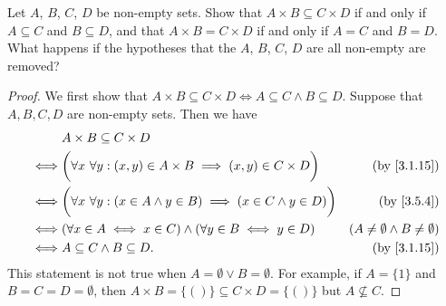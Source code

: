 \begin{exercise}\label{ex 3.5.6}
  Let \(A\), \(B\), \(C\), \(D\) be non-empty sets.
  Show that \(A \times B \subseteq C \times D\) if and only if \(A \subseteq C\) and \(B \subseteq D\), and that \(A \times B = C \times D\) if and only if \(A = C\) and \(B = D\).
  What happens if the hypotheses that the \(A\), \(B\), \(C\), \(D\) are all non-empty are removed?
\end{exercise}

\begin{proof}
  We first show that \(A \times B \subseteq C \times D \iff A \subseteq C \land B \subseteq D\).
  Suppose that \(A, B, C, D\) are non-empty sets.
  Then we have
  \begin{align*}
         & A \times B \subseteq C \times D                                                                                                         \\
    \iff & \bigg(\forall x \ \forall y : (x, y) \in A \times B \implies (x, y) \in C \times D\bigg)    & \text{(by \cref{3.1.15})}                 \\
    \iff & \bigg(\forall x \ \forall y :(x \in A \land y \in B) \implies (x \in C \land y \in D)\bigg) & \text{(by \cref{3.5.4})}                  \\
    \iff & (\forall x \in A \iff x \in C) \land (\forall y \in B \iff y \in D)                         & (A \neq \emptyset \land B \neq \emptyset) \\
    \iff & A \subseteq C \land B \subseteq D.                                                          & \text{(by \cref{3.1.15})}
  \end{align*}
  This statement is not true when \(A = \emptyset \lor B = \emptyset\).
  For example, if \(A = \{1\}\) and \(B = C = D = \emptyset\), then \(A \times B = \{()\} \subseteq C \times D = \{()\}\) but \(A \not \subseteq C\).


\end{proof}
